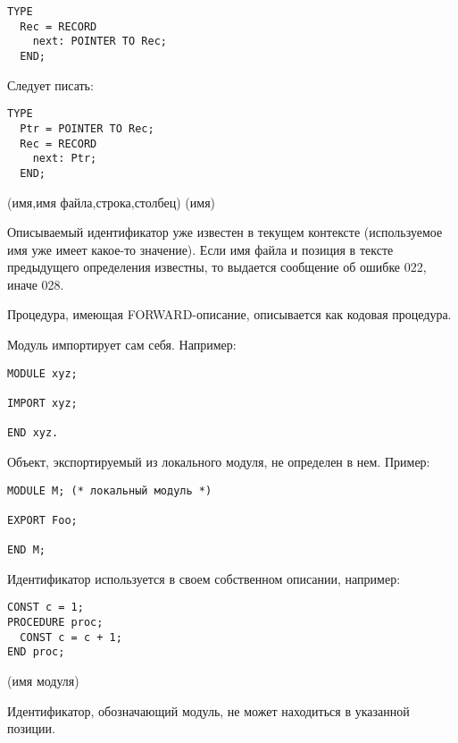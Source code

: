 \begin{verbatim}
TYPE
  Rec = RECORD
    next: POINTER TO Rec;
  END;
\end{verbatim}

Следует писать:

\begin{verbatim}
TYPE
  Ptr = POINTER TO Rec;
  Rec = RECORD
    next: Ptr;
  END;
\end{verbatim}

(имя,имя файла,строка,столбец)
(имя)

Описываемый идентификатор уже известен в текущем контексте
(используемое имя уже имеет какое-то значение). Если имя файла
и позиция в тексте предыдущего определения известны, то выдается
сообщение об ошибке 022, иначе 028.


Процедура, имеющая FORWARD-описание, описывается как кодовая процедура.


Модуль импортирует сам себя. Например:
\begin{verbatim}
MODULE xyz;

IMPORT xyz;

END xyz.
\end{verbatim}


Объект, экспортируемый из локального модуля, не определен в нем.
Пример:

\begin{verbatim}
MODULE M; (* локальный модуль *)

EXPORT Foo;

END M;
\end{verbatim}



Идентификатор используется в своем собственном описании, например:
\begin{verbatim}
CONST c = 1;
PROCEDURE proc;
  CONST c = c + 1;
END proc;
\end{verbatim}

(имя модуля)

Идентификатор, обозначающий модуль, не может находиться в указанной позиции.

